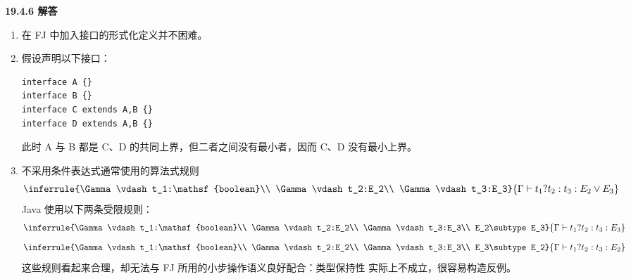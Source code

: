 \begin{taplauthorsolutionentrybox}
\label{sol:author:19.4.6}
\textbf{19.4.6 解答}

\begin{enumerate}
\item 在 FJ 中加入接口的形式化定义并不困难。

\item 假设声明以下接口：
\begin{lstlisting}
interface A {}
interface B {}
interface C extends A,B {}
interface D extends A,B {}
\end{lstlisting}
此时 A 与 B 都是 C、D 的共同上界，但二者之间没有最小者，因而
C、D 没有最小上界。

\item 不采用条件表达式通常使用的算法式规则
\[
\inferrule
 {\Gamma\vdash t_1:\mathsf{boolean}\\
  \Gamma\vdash t_2:E_2\\
  \Gamma\vdash t_3:E_3}
 {\Gamma\vdash t_1?t_2:t_3:E_2\mathbin{\lor}E_3}
\]
Java 使用以下两条受限规则：
\[
\inferrule
 {\Gamma\vdash t_1:\mathsf{boolean}\\
  \Gamma\vdash t_2:E_2\\
  \Gamma\vdash t_3:E_3\\
  E_2\subtype E_3}
 {\Gamma\vdash t_1?t_2:t_3:E_3}
\]
\[
\inferrule
 {\Gamma\vdash t_1:\mathsf{boolean}\\
  \Gamma\vdash t_2:E_2\\
  \Gamma\vdash t_3:E_3\\
  E_3\subtype E_2}
 {\Gamma\vdash t_1?t_2:t_3:E_2}
\]
这些规则看起来合理，却无法与 FJ 所用的小步操作语义良好配合：类型保持性
实际上不成立，很容易构造反例。

\end{enumerate}

\end{taplauthorsolutionentrybox}

